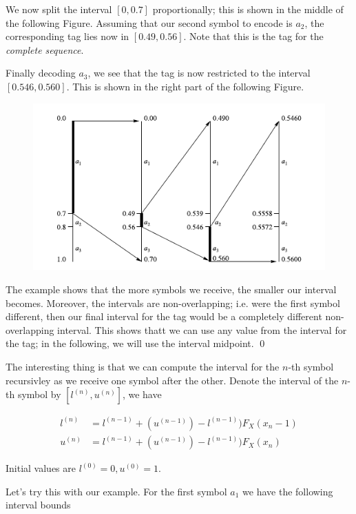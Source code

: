 We now split the interval $[0, 0.7]$ proportionally; this is shown in the middle of the following Figure. Assuming that our second symbol to encode is $a_2$, the corresponding tag lies now in $[0.49, 0.56]$. Note that this is the tag for the \emph{complete sequence}.

Finally decoding $a_3$, we see that the tag is now restricted to the interval $[0.546, 0.560]$. This is shown in the right part of the following Figure.

\begin{figure}[H]
    \centering
    \includegraphics[scale=0.7]{images/2021-05-19-arith_coding_1.png}
  \end{figure}
  
The example shows that the more symbols we receive, the smaller our interval becomes. Moreover, the intervals are non-overlapping; i.e. were the first symbol different, then our final interval for the tag would be a completely different non-overlapping interval. This shows thatt we can use any value from the interval for the tag; in the following, we will use the interval midpoint. \qed

The interesting thing is that we can compute the interval for the $n$-th symbol recursivley as we receive one symbol after the other. Denote the interval of the $n$-th symbol by $[l^{(n)}, u^{(n)}]$, we have

\begin{align}\label{2021-05-18:eq1}
    l^{(n)} &= l^{(n-1)} + (u^{(n-1)}) - l^{(n-1)}) F_X(x_n-1) \\
    u^{(n)} &= l^{(n-1)} + (u^{(n-1)}) - l^{(n-1)}) F_X(x_n)
\end{align}

Initial values are $l^{(0)} = 0, u^{(0)} = 1$.

Let's try this with our example. For the first symbol $a_1$ we have the following interval bounds

